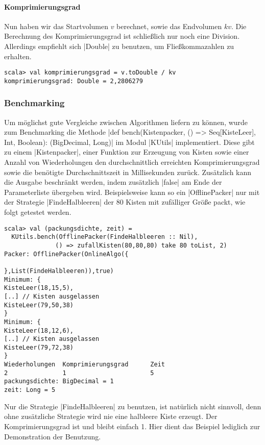 \paragraph{Komprimierungsgrad}
 Nun haben wir das Startvolumen $v$ berechnet, sowie das Endvolumen $kv$.
 Die Berechnung des Komprimierungsgrad ist schließlich nur noch eine Division.
 Allerdings empfiehlt sich |Double| zu benutzen, um Fließkommazahlen zu erhalten.
\begin{lstlisting}
scala> val komprimierungsgrad = v.toDouble / kv
komprimierungsgrad: Double = 2,2806279
\end{lstlisting}
\subsubsection{Benchmarking}
 Um möglichst gute Vergleiche zwischen Algorithmen liefern zu können,
  wurde zum Benchmarking die Methode |def bench(Kistenpacker, () => Seq[KisteLeer], Int, Boolean): (BigDecimal, Long)| im Modul |KUtils| implementiert.
 Diese gibt zu einem |Kistenpacker|,
  einer Funktion zur Erzeugung von Kisten sowie einer Anzahl von Wiederholungen den durchschnittlich erreichten Komprimierungsgrad sowie die benötigte Durchschnittszeit in Millisekunden zurück.
 Zusätzlich kann die Ausgabe beschränkt werden, indem zusätzlich |false| am Ende der Parameterliste übergeben wird.
 Beispielsweise kann so ein |OfflinePacker| nur mit der Strategie |FindeHalbleeren| der 80 Kisten mit zufälliger Größe packt, wie folgt getestet werden.
\begin{lstlisting}
scala> val (packungsdichte, zeit) =
  KUtils.bench(OfflinePacker(FindeHalbleeren :: Nil),
              () => zufallKisten(80,80,80) take 80 toList, 2) 
Packer: OfflinePacker(OnlineAlgo({

},List(FindeHalbleeren)),true)
Minimum: {
KisteLeer(18,15,5),
[..] // Kisten ausgelassen
KisteLeer(79,50,38)
}
Minimum: {
KisteLeer(18,12,6),
[..] // Kisten ausgelassen
KisteLeer(79,72,38)
}
Wiederholungen  Komprimierungsgrad      Zeit
2               1                       5
packungsdichte: BigDecimal = 1
zeit: Long = 5
\end{lstlisting}
 Nur die Strategie |FindeHalbleeren| zu benutzen, ist natürlich nicht sinnvoll,
  denn ohne zusätzliche Strategie wird nie eine halbleere Kiste erzeugt. Der Komprimierungsgrad ist und bleibt einfach 1.
 Hier dient das Beispiel lediglich zur Demonstration der Benutzung.

\addtolength{\textheight}{0cm}
\lstset{xleftmargin=-.8cm,xrightmargin=-.8cm}
\lstset{basicstyle=\ttfamily\small}

